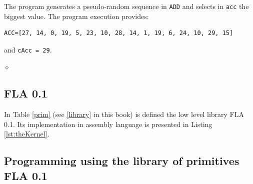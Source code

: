 \begin{exemplu}
The program generates a pseudo-random sequence in {\tt ADD} and selects in {\tt acc} the biggest value.
{\em 
{}
}
The program execution provides:
\begin{verbatim}
ACC=[27, 14, 0, 19, 5, 23, 10, 28, 14, 1, 19, 6, 24, 10, 29, 15]
\end{verbatim}
and {\tt cAcc = 29}.

$\diamond$
\end{exemplu}


\subsection{FLA 0.1}

In  Table \ref{prim} (see \ref{library} in this book) is defined the low level library FLA 0.1. Its implementation in assembly language is presented in Listing \ref{lst:theKernel}.


\subsection{Programming using the library of primitives FLA 0.1}

